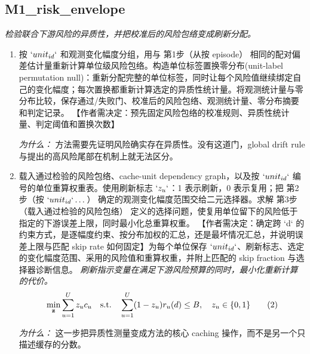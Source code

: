 \documentclass[10pt,a4paper]{article}
\begin{document}
\subsection*{M1\_risk\_envelope}
\emph{检验联合下游风险的异质性，并把校准后的风险包络变成刷新分配。}
\begin{enumerate}[leftmargin=*,start=2]
  \item 按 \(`unit_{id}`\) 和观测变化幅度分组，用与 第1步（从按 episode） 相同的配对偏差估计量重新计算单位级风险包络。构造单位标签置换零分布(unit-label permutation null)：重新分配完整的单位标签，同时让每个风险值继续绑定自己的变化幅度；每次置换都重新计算选定的异质性统计量。将观测统计量与零分布比较，保存通过/失败门、校准后的风险包络、观测统计量、零分布摘要和判定记录。 【作者需决定：预先固定风险包络的校准规则、异质性统计量、判定阈值和置换次数】
\par\emph{为什么：} 方法需要先证明风险确实存在异质性。没有这道门，global drift rule 与提出的高风险尾部在机制上就无法区分。
  \item 载入通过检验的风险包络、cache-unit dependency graph，以及按 \(`unit_{id}`\) 编号的单位重算权重表。使用刷新标志 \(`z_{u}`\)：1 表示刷新，0 表示复用；把 第2步（按 \(`unit_{id}`\dots \)） 确定的观测变化幅度范围交给二元选择器。求解 第3步（载入通过检验的风险包络） 定义的选择问题，使复用单位留下的风险低于指定的下游误差上限，同时最小化总重算权重。 【作者需决定：确定跨 `d` 的约束方式，是逐幅度约束、按分布加权的汇总，还是最坏情况汇总，并说明误差上限与匹配 skip rate 如何固定】为每个单位保存 \(`unit_{id}`\)、刷新标志、选定的变化幅度范围、采用的风险值和重算权重，并附上匹配的 skip fraction 与选择器诊断信息。
\noindent\emph{刷新指示变量在满足下游风险预算的同时，最小化重新计算的代价。}
\begin{equation}
\resizebox{\ifdim\width>\linewidth \linewidth\else\width\fi}{!}{$\displaystyle \min_{\mathbf{z}}\sum_{u=1}^{U}z_uc_u\quad\text{s.t.}\quad\sum_{u=1}^{U}(1-z_u)r_u(d)\leq B,\quad z_u\in\{0,1\}$} \tag{2}
\end{equation}
\par\emph{为什么：} 这一步把异质性测量变成方法的核心 caching 操作，而不是另一个只描述缓存的分数。
\end{enumerate}
\end{document}
